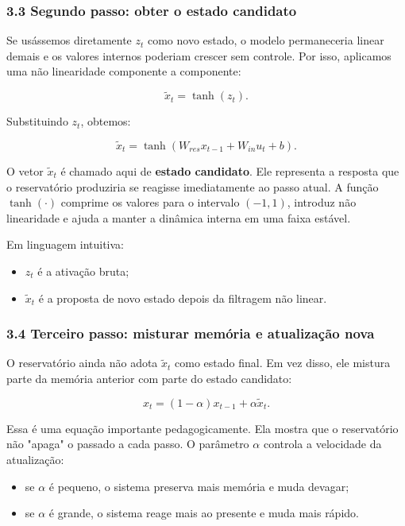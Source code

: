 \documentclass[12pt]{article}
\providecommand{\tightlist}{%
  \setlength{\itemsep}{0pt}\setlength{\parskip}{0pt}}
\begin{document}
\subsubsection{3.3 Segundo passo: obter o estado candidato}\label{33-segundo-passo-obter-o-estado-candidato}

Se usássemos diretamente \(z_t\) como novo estado, o modelo permaneceria linear demais e os valores internos poderiam crescer sem controle. Por isso, aplicamos uma não linearidade componente a componente:

\[
\widetilde{x}_t = \tanh(z_t).
\]

Substituindo \(z_t\), obtemos:

\[
\widetilde{x}_t = \tanh(W_{res} x_{t-1} + W_{in} u_t + b).
\]

O vetor \(\widetilde{x}_t\) é chamado aqui de \textbf{estado candidato}. Ele representa a resposta que o reservatório produziria se reagisse imediatamente ao passo atual. A função \(\tanh(\cdot)\) comprime os valores para o intervalo \((-1,1)\), introduz não linearidade e ajuda a manter a dinâmica interna em uma faixa estável.

Em linguagem intuitiva:

\begin{itemize}
\tightlist
\item
  \(z_t\) é a ativação bruta;
\item
  \(\widetilde{x}_t\) é a proposta de novo estado depois da filtragem não linear.
\end{itemize}

\subsubsection{3.4 Terceiro passo: misturar memória e atualização nova}\label{34-terceiro-passo-misturar-memuxf3ria-e-atualizauxe7uxe3o-nova}

O reservatório ainda não adota \(\widetilde{x}_t\) como estado final. Em vez disso, ele mistura parte da memória anterior com parte do estado candidato:

\[
x_t = (1 - \alpha) x_{t-1} + \alpha \widetilde{x}_t.
\]

Essa é uma equação importante pedagogicamente. Ela mostra que o reservatório não "apaga" o passado a cada passo. O parâmetro \(\alpha\) controla a velocidade da atualização:

\begin{itemize}
\tightlist
\item
  se \(\alpha\) é pequeno, o sistema preserva mais memória e muda devagar;
\item
  se \(\alpha\) é grande, o sistema reage mais ao presente e muda mais rápido.
\end{itemize}
\end{document}
